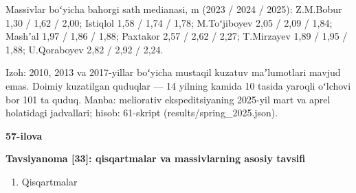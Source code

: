 \documentclass[14pt,a4paper,oneside]{extreport}
\providecommand{\tightlist}{\setlength{\itemsep}{0pt}\setlength{\parskip}{0pt}}
\newcommand{\oakilova}[1]{\clearpage\begin{flushright}\bfseries #1\end{flushright}}
\newcommand{\oakilovanom}[1]{{\centering\setstretch{1}\bfseries #1\par}\nopagebreak\vspace{2pt}}
\begin{document}
Massivlar boʻyicha bahorgi sath medianasi, m (2023 / 2024 / 2025):
Z.M.Bobur 1,30 / 1,62 / 2,00; Istiqlol 1,58 / 1,74 / 1,78; M.Toʻjiboyev
2,05 / 2,09 / 1,84; Mashʼal 1,97 / 1,86 / 1,88; Paxtakor 2,57 / 2,62 /
2,27; T.Mirzayev 1,89 / 1,95 / 1,88; U.Qoraboyev 2,82 / 2,92 / 2,24.

Izoh: 2010, 2013 va 2017-yillar boʻyicha mustaqil kuzatuv maʼlumotlari
mavjud emas. Doimiy kuzatilgan quduqlar --- 14 yilning kamida 10 tasida
yaroqli oʻlchovi bor 101 ta quduq. Manba: meliorativ ekspeditsiyaning
2025-yil mart va aprel holatidagi jadvallari; hisob: 61-skript
(results/spring\_2025.json).

\oakilova{57-ilova}

\oakilovanom{\textbf{Tavsiyanoma {[}33{]}: qisqartmalar va massivlarning asosiy
tavsifi}}

\begin{enumerate}
\def\labelenumi{\alph{enumi})}
\tightlist
\item
  Qisqartmalar
\end{enumerate}
\end{document}
